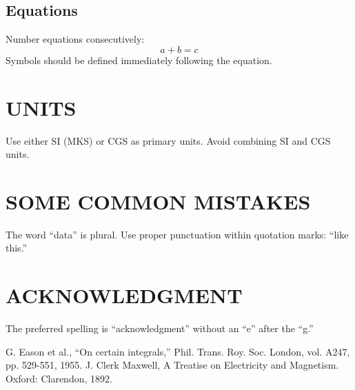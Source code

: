 \documentclass[conference]{IEEEtran}
\begin{document}
\subsection{Equations}
Number equations consecutively:
\begin{equation}
a + b = c
\end{equation}
Symbols should be defined immediately following the equation.

\section{UNITS}
Use either SI (MKS) or CGS as primary units. Avoid combining SI and CGS units.

\section{SOME COMMON MISTAKES}
The word ``data'' is plural. Use proper punctuation within quotation marks: ``like this.'' 

\section*{ACKNOWLEDGMENT}
The preferred spelling is ``acknowledgment'' without an ``e'' after the ``g.''

\balance %

\begin{thebibliography}{9}
 G. Eason et al., ``On certain integrals,'' Phil. Trans. Roy. Soc. London, vol. A247, pp. 529-551, 1955.
 J. Clerk Maxwell, A Treatise on Electricity and Magnetism. Oxford: Clarendon, 1892.
\end{thebibliography}
\end{document}
